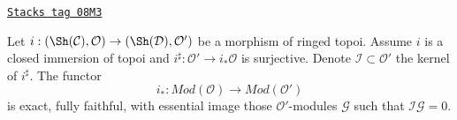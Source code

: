 \begin{lemma}
\label{sites-modules-lemma-i-star-equivalence}
\href{https://stacks.math.columbia.edu/tag/08M3}{\texttt{Stacks tag 08M3}}

Let $i : (\Sh(\mathcal{C}), \mathcal{O}) \to (\Sh(\mathcal{D}), \mathcal{O}')$
be a morphism of ringed topoi. Assume $i$ is a closed immersion of topoi
and $i^\sharp : \mathcal{O}' \to i_*\mathcal{O}$ is surjective.
Denote $\mathcal{I} \subset \mathcal{O}'$ the kernel of $i^\sharp$.
The functor
$$
i_* :
\textit{Mod}(\mathcal{O})
\longrightarrow
\textit{Mod}(\mathcal{O}')
$$
is exact, fully faithful, with essential image those
$\mathcal{O}'$-modules $\mathcal{G}$ such that $\mathcal{I}\mathcal{G} = 0$.
\end{lemma}

